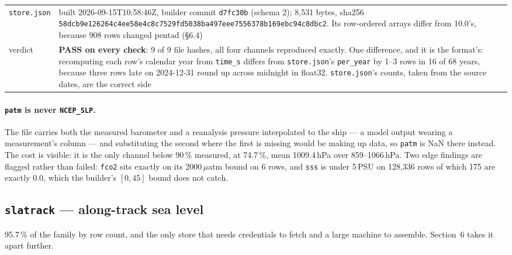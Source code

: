 \documentclass[10pt]{article}
\newcommand{\code}[1]{\texttt{#1}}
\begin{document}
\begin{table}[h]
\begin{tabular}{@{}>{\raggedright\arraybackslash}p{2.8cm}>{\raggedright\arraybackslash}p{12.5cm}@{}}
\code{store.json} & built 2026-09-15T10:58:46Z, builder commit \code{d7fc30b} (schema 2); 8,531 bytes, sha256 \code{58dcb9e126264c4ee58e4c8c7529fd5038ba497eee7556378b169ebc94c8dbc2}. Its row-ordered arrays differ from 10.0's, because 908 rows changed pentad (\S6.4) \\
verdict & \textbf{PASS on every check}: 9 of 9 file hashes, all four channels reproduced exactly. One difference, and it is the format's: recomputing each row's calendar year from \code{time\_s} differs from \code{store.json}'s \code{per\_year} by 1--3 rows in 16 of 68 years, because three rows late on 2024-12-31 round up across midnight in float32. \code{store.json}'s counts, taken from the source dates, are the correct side \\
\bottomrule
\end{tabular}
\end{table}

\paragraph{\code{patm} is never \code{NCEP\_SLP}.} The file carries both the
measured barometer and a reanalysis pressure interpolated to the ship --- a model
output wearing a measurement's column --- and substituting the second where the
first is missing would be making up data, so \code{patm} is NaN there instead.
The cost is visible: it is the only channel below 90\,\% measured, at 74.7\,\%,
mean 1009.4\,hPa over 859--1066\,hPa. Two edge findings are flagged rather than
failed: \code{fco2} sits exactly on its 2000\,$\mu$atm bound on 6 rows, and
\code{sss} is under 5\,PSU on 128,336 rows of which 175 are exactly 0.0, which
the builder's $[0, 45]$ bound does not catch.

\subsection{\code{slatrack} --- along-track sea level}

95.7\,\% of the family by row count, and the only store that needs credentials
to fetch and a large machine to assemble. Section~6 takes it apart further.
\end{document}
